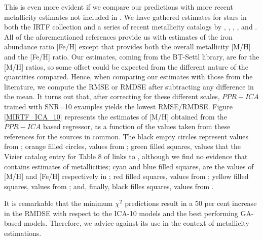 This is even more evident if we compare our predictions with more
recent metallicity estimates not included in \cite{cesetti}. We have
gathered estimates for stars in both the IRTF collection and a series
of recent metallicity catalogs
by \cite{RA2012}, \cite{NevesIII}, \cite{Newton2014}, \cite{Gaidos2015},
and \cite{Mann2015}. All of the aforementioned references provide us
with estimates of the iron abundance ratio [Fe/H] except \cite{RA2012}
that provides both the overall metallicity [M/H] and the [Fe/H]
ratio. Our estimates, coming from the BT-Settl library, are for the
[M/H] ratios, so some offset could be expected from the different
nature of the quantities compared. Hence, when comparing our estimates
with those from the literature, we compute the RMSE or RMDSE after
subtracting any difference in the mean. It turns out that, after
correcting for these different scales, $PPR-ICA$ trained with SNR=10
examples yields the lowest RMSE/RMDSE. Figure \ref{MIRTF_ICA_10}
represents the estimates of [M/H] obtained from the $PPR-ICA$ based
regressor, as a function of the values taken from these references for
the sources in common. The black empty circles represent values
from \cite{cesetti} ; orange filled circles, values
from \cite{NevesIII}; green filled squares, values that the Vizier
catalog entry for Table 8 of \cite{NevesIII} links to \cite{Jao},
although we find no evidence that \cite{Jao} contains estimates of
metallicities; cyan and blue filled squares, are the values of [M/H]
and [Fe/H] respectively in \cite{RA2012}; red filled squares, values
from \cite{Mann2015}; yellow filled squares, values
from \cite{Newton2014}; and, finally, black filles squares, values
from \cite{Gaidos2015}.

It is remarkable that the minimum $\chi^2$ predictions result in a
50 per cent increase in the RMDSE with respect to the ICA-10 models and the
best performing GA-based models. Therefore, we advice against its use
in the context of metallicity estimations. 

